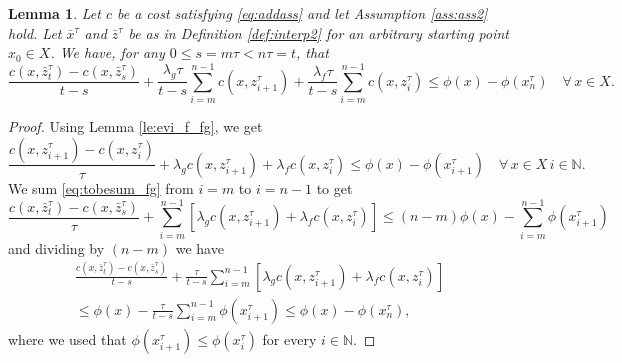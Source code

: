 \documentclass[reqno]{amsart}
\newcounter{results}[section]
\theoremstyle{plain}
\newtheorem{lemma}[results]{Lemma}
\theoremstyle{remark}
\theoremstyle{plain}
\numberwithin{equation}{section}
\theoremstyle{remark}
\newcommand{\N}{\mathbb{N}}
\begin{document}
\begin{lemma}\label{le:intevi_fg}  Let $c$ be a cost satisfying \eqref{eq:addass}  and let  Assumption \ref{ass:ass2} hold. Let  $\bar{x}^\tau$ and $\bar{z}^\tau$ be as in Definition \ref{def:interp2} for an arbitrary starting point $x_0 \in X$.
 We  have, for any $0 \le s= m\tau < n\tau = t$, that
\begin{equation}\label{eq:proto_evi_fg}
    \frac{c(x,\bar{z}_t^\tau)-c(x,\bar{z}_s^\tau)}{t-s} + \frac{\lambda_g \tau}{t-s} \sum_{i=m}^{n-1}c(x,z_{i+1}^\tau)+ \frac{\lambda_f \tau}{t-s} \sum_{i=m}^{n-1}c(x,z_{i}^\tau) \le \phi(x) -\phi(x_{n}^\tau) \quad \forall\, x \in X.
\end{equation}

\end{lemma}
\begin{proof}

 Using  Lemma \ref{le:evi_f_fg}, we get 
\begin{equation}\label{eq:tobesum_fg}
\frac{c(x,z_{i+1}^\tau)- c(x,z_i^\tau)}{\tau} + \lambda_g c(x,z_{i+1}^\tau)+ \lambda_f c(x,z_{i}^\tau) \le \phi(x)-\phi(x_{i+1}^\tau) \quad \forall \, x \in X \, i \in  \N .
\end{equation}
We sum \eqref{eq:tobesum_fg} from $i=m$ to $i=n-1$ to get
\[ \frac{c(x,\bar{z}_t^\tau)-c(x,\bar{z}_s^\tau)}{\tau} + \sum_{i=m}^{n-1}[\lambda_g c(x,z_{i+1}^\tau)+ \lambda_f c(x,z_{i}^\tau)] \le (n-m)\phi(x) - \sum_{i=m}^{n-1} \phi(x_{i+1}^\tau) \]
and dividing by $(n-m)$ we have
\begin{multline}\label{eq:proto-EVI_fg}
    \frac{c(x,\bar{z}_t^\tau)-c(x,\bar{z}_s^\tau)}{t-s} + \frac{\tau}{t-s} \sum_{i=m}^{n-1}[\lambda_g c(x,z_{i+1}^\tau)+ \lambda_f c(x,z_{i}^\tau)]\\
    \le \phi(x) - \frac{\tau}{t-s} \sum_{i=m}^{n-1} \phi(x_{i+1}^\tau)\le \phi(x) -\phi(x_{n}^\tau) ,  
\end{multline}
where we used that $\phi(x_{i+1}^\tau) \le \phi(x_i^\tau)$ for every $i \in  \N $.
\end{proof}
\end{document}
